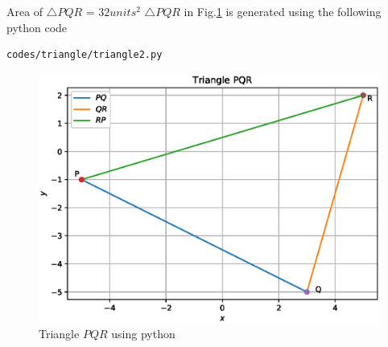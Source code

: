 \begin{enumerate}[label=\arabic*.,ref=\thesubsection.\theenumi]
Area of $\triangle{PQR}$ = $32 units^2$
$\triangle{PQR}$ in Fig.\ref{fig:triangle_2}  is generated using the following python code
\begin{lstlisting}
codes/triangle/triangle2.py
\end{lstlisting}
\begin{figure}[!ht]
\centering
\includegraphics[width=\columnwidth]{./codes/triangle/triangle2.eps}
\caption{Triangle $PQR$ using python}
\label{fig:triangle_2}
\end{figure} 
\end{enumerate}